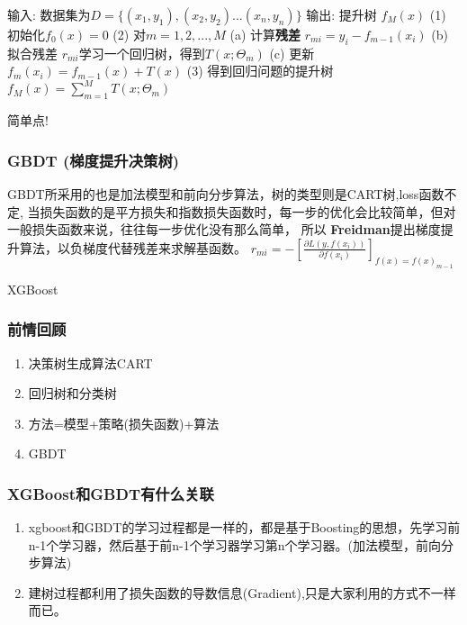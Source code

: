 \documentclass[11pt]{article}
\providecommand{\tightlist}{%
      \setlength{\itemsep}{0pt}\setlength{\parskip}{0pt}}
\begin{document}
输入: 数据集为\(D=\{(x_1,y_1),(x_2,y_2)\dots(x_n,y_n)\}\) 输出: 提升树
\(f_M(x)\) (1) 初始化\(f_0(x)=0\) (2) 对\(m=1,2,...,M\) (a)
计算\textbf{残差} \(r_{mi}=y_i-f_{m-1}(x_i)\) (b) 拟合残差
\(r_{mi}\)学习一个回归树，得到\(T(x; \Theta_m)\) (c)
更新\(f_m(x_i)=f_{m-1}(x)+T(x)\) (3)
得到回归问题的提升树\(f_M(x) = \sum_{m=1}^{M}T(x;\Theta_m)\)

    简单点!

    

    \subsubsection{GBDT
(梯度提升决策树)}\label{gbdt-ux68afux5ea6ux63d0ux5347ux51b3ux7b56ux6811}

GBDT所采用的也是加法模型和前向分步算法，树的类型则是CART树,loss函数不定,
当损失函数的是平方损失和指数损失函数时，每一步的优化会比较简单，但对一般损失函数来说，往往每一步优化没有那么简单，
所以 \textbf{Freidman}提出梯度提升算法，以负梯度代替残差来求解基函数。
\(r_{mi} = -[\frac{\partial L(y,f(x_i))}{\partial f(x_i)}]_{f(x)=f(x)_{m-1}}\)

    XGBoost

\subsubsection{前情回顾}\label{ux524dux60c5ux56deux987e}

\begin{enumerate}
\def\labelenumi{\arabic{enumi}.}
\tightlist
\item
  决策树生成算法CART
\item
  回归树和分类树
\item
  方法=模型+策略(损失函数)+算法
\item
  GBDT
\end{enumerate}

    \subsubsection{XGBoost和GBDT有什么关联}\label{xgboostux548cgbdtux6709ux4ec0ux4e48ux5173ux8054}

\begin{enumerate}
\def\labelenumi{\arabic{enumi}.}
\tightlist
\item
  xgboost和GBDT的学习过程都是一样的，都是基于Boosting的思想，先学习前n-1个学习器，然后基于前n-1个学习器学习第n个学习器。(加法模型，前向分步算法)
\item
  建树过程都利用了损失函数的导数信息(Gradient),只是大家利用的方式不一样而已。
\end{enumerate}
\end{document}
